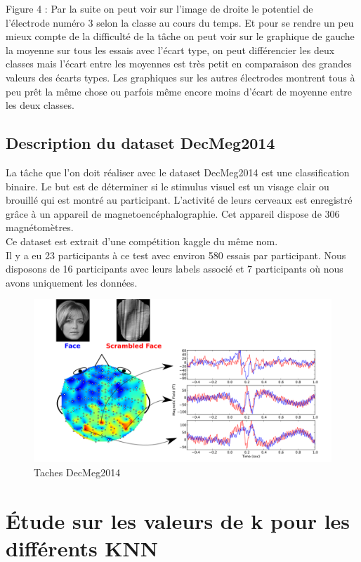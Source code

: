 \documentclass{article}[12pt]
\begin{document}
    
Figure 4 : Par la suite on peut voir sur l'image de droite le potentiel de l’électrode numéro 3 selon la classe au cours du temps. Et pour se rendre un peu mieux compte de la difficulté de la tâche on peut voir sur le graphique de gauche la moyenne sur tous les essais avec l’écart type, on peut différencier les deux classes mais l’écart entre les moyennes est très petit en comparaison des grandes valeurs des écarts types. Les graphiques sur les autres électrodes montrent tous à peu prêt la même chose ou parfois même encore moins d’écart de moyenne entre les deux classes.

\subsection{Description du dataset DecMeg2014}
La tâche que l'on doit réaliser avec le dataset DecMeg2014 est une classification binaire. Le but est de déterminer si le stimulus visuel est un visage clair ou brouillé qui est montré au participant. L'activité de leurs cerveaux est enregistré grâce à un appareil de magnetoencéphalographie. Cet appareil dispose de 306 magnétomètres.
\\
Ce dataset est extrait d'une compétition kaggle du même nom\cite{noauthor_decmeg2014_nodate}.
\\
Il y a eu 23 participants à ce test avec environ 580 essais par participant. Nous disposons de 16 participants avec leurs labels associé et 7 participants où nous avons uniquement les données.
\begin{figure}[H]
\begin{center}
\includegraphics[scale=0.4]{images/DECMEG2014.png}
\end{center}
\caption{Taches DecMeg2014}
\end{figure}


\section{Étude sur les valeurs de k pour les différents KNN}
\end{document}
